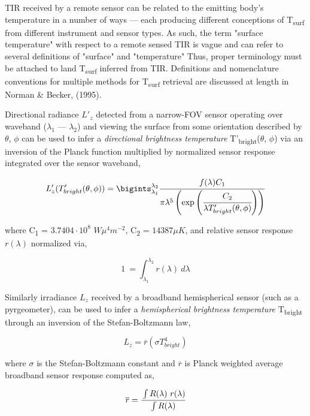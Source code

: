 TIR received by a remote sensor can be related to the emitting body's temperature in a number of ways --- each producing different conceptions of T\textsubscript{surf} from different instrument and sensor types. As such, the term "surface temperature" with respect to a remote sensed TIR is vague and can refer to several definitions of "surface" and "temperature" Thus, proper terminology must be attached to land T\textsubscript{surf} inferred from TIR. Definitions and nomenclature conventions for multiple methods for T\textsubscript{surf} retrieval are discussed at length in Norman \& Becker, (1995)\cite{Norman1995}.

Directional radiance $ L'_z $ detected from a narrow-FOV sensor operating over waveband (\(\lambda_1\) --- \(\lambda_2\)) and viewing the surface from some orientation described by \(\theta\), \(\phi\) can be used to infer a \textit{directional brightness temperature} T'\textsubscript{bright}(\(\theta\), \(\phi\)) via an inversion of the Planck function multiplied by normalized sensor response integrated over the sensor waveband,

\begin{equation}
L'_z(T'_{bright} (\theta, \phi)) = \bigints_{\lambda_1}^{\lambda_2} \cfrac{f(\lambda) C_1}{\pi \lambda^5 \left( \exp\left(\cfrac{C_2}{\lambda T'_{bright} (\theta, \phi)}\right)\right)}
\end{equation}

\noindent where C\textsubscript{1} = $ 3.7404 \cdot 10^8 $ $ W\mu^4 m^{-2} $, C\textsubscript{2} = $ 14387 \mu K $, and relative sensor response $ r(\lambda) $ normalized via,

\begin{equation}
1 ~ =  \int_{\lambda_1}^{\lambda_2} r(\lambda) ~ d\lambda
\end{equation}

Similarly irradiance $L_z$ received by a broadband hemispherical sensor (such as a pyrgeometer), can be used to infer a \textit{hemispherical brightness temperature} T\textsubscript{bright} through an inversion of the Stefan-Boltzmann law,

\begin{equation}
\label{stefb1}
L_z = \overline{r} (\sigma T_{bright}^4)
\end{equation}

\noindent where $ \sigma $ is the Stefan-Boltzmann constant and $ \overline{r} $ is Planck weighted average broadband sensor response computed as,

\begin{equation}
\overline{r} = \cfrac{\int R(\lambda) ~ r(\lambda)}{\int R(\lambda)}
\end{equation}

